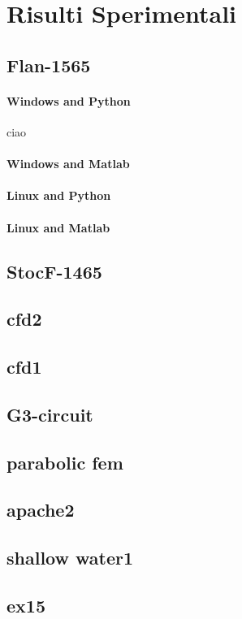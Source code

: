 \section{Risulti Sperimentali}
\subsection{Flan-1565}
\paragraph{Windows and Python}
ciao
\paragraph{Windows and Matlab}

\paragraph{Linux and Python}
\paragraph{Linux and Matlab}

\subsection{StocF-1465}
\subsection{cfd2}
\subsection{cfd1}
\subsection{G3-circuit}
\subsection{parabolic fem} 
\subsection{apache2}
\subsection{shallow water1}
\subsection{ex15}
